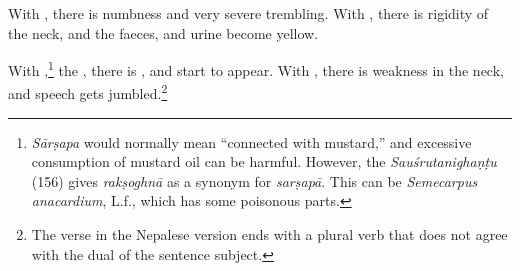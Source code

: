 \begin{translation}
    With
    , there is numbness
    and very severe trembling.
%
    With
    , there is rigidity of the neck, and the faeces,
    and urine become yellow.
    
    With %
,\footnote{\emph{Sārṣapa} would normally mean
“connected with mustard,” and excessive consumption of mustard oil can be 
harmful. However, the \emph{Sauśrutanighaṇṭu} (156) gives
\emph{rakṣoghnā} as a synonym for \emph{sarṣapā}. This can be
\textit{Semecarpus anacardium}, L.f., which has some poisonous parts.} the
, there is ,
and  start to appear. %
With , there is weakness
in the neck, and speech gets jumbled.\footnote{The verse in the Nepalese version 
ends with a plural verb that does not agree with the dual of the sentence subject.}
    

\end{translation}
